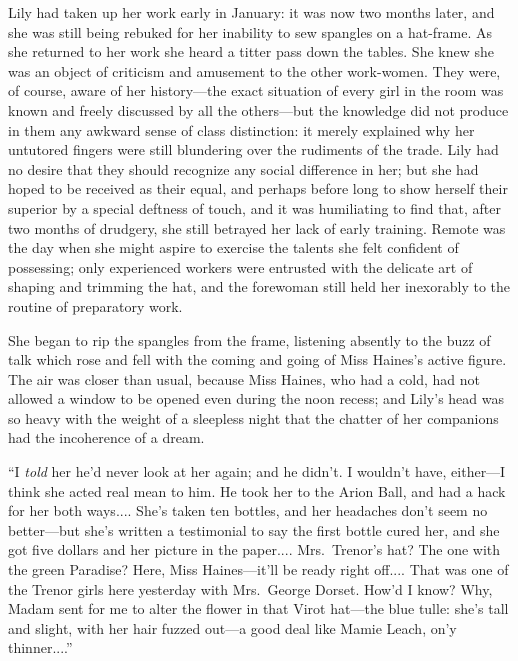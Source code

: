 \documentclass[12pt,a4paper]{book}
\begin{document}
Lily had taken up her work early in January: it was now two
months later, and she was still being rebuked for her inability
to sew spangles on a hat-frame. As she returned to her work she
heard a titter pass down the tables. She knew she was an object
of criticism and amusement to the other work-women. They were,
of course, aware of her history---the exact situation of
every girl in the room was known and freely discussed by all the
others---but the knowledge did not produce in them any awkward
sense of class distinction: it merely explained why her untutored
fingers were still blundering over the rudiments of the trade. 
Lily had no desire that they should recognize any social
difference in her; but she had hoped to be received as their
equal, and perhaps before long to show herself their superior by
a special deftness of touch, and it was humiliating to find that,
after two months of drudgery, she still betrayed her lack of
early training. Remote was the day when she might aspire to
exercise the talents she felt confident of possessing; only
experienced workers were entrusted with the delicate art of
shaping and trimming the hat, and the forewoman still held her
inexorably to the routine of preparatory work.





She began to rip the spangles from the frame, listening absently
to the buzz of talk which rose and fell with the coming and going
of Miss Haines's active figure. The air was closer than usual,
because Miss Haines, who had a cold, had not allowed a window to
be opened even during the noon recess; and Lily's head was so
heavy with the weight of a sleepless night that the chatter of
her companions had the incoherence of a dream.





``I \textit{told} her he'd never look at her again; and he didn't. I
wouldn't have, either---I think she acted real mean to him. He
took her to the Arion Ball, and had a hack for her both ways.... 
She's taken ten bottles, and her headaches don't seem no
better---but she's written a testimonial to say the first bottle
cured her, and she got five dollars and her picture in the
paper.... Mrs.\ Trenor's hat? The one with the green Paradise? 
Here, Miss Haines---it'll be ready right off.... That was one of
the Trenor girls here yesterday with Mrs.\ George Dorset. How'd I
know? Why, Madam sent for me to alter the flower in that Virot
hat---the blue tulle: she's tall and slight, with her hair fuzzed
out---a good deal like Mamie Leach, on'y thinner....''
\end{document}
